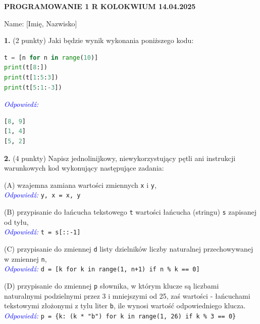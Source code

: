 \documentclass[a4paper,12pt]{article}
\begin{document}
\begin{center}
    \textbf{\Large PROGRAMOWANIE 1 R \hfill KOLOKWIUM \hfill 14.04.2025}
\end{center}

\vspace{0.5cm}
\noindent Name: [Imię, Nazwisko]

\vspace{0.5cm}

\noindent \textbf{1.} (2 punkty) Jaki będzie wynik wykonania poniższego kodu:
\begin{lstlisting}[language=Python]
t = [n for n in range(10)]
print(t[8:])
print(t[1:5:3])
print(t[5:1:-3])
\end{lstlisting}
\textcolor{blue}{\textit{Odpowiedź:}}
\begin{lstlisting}[language=Python, backgroundcolor=\color{white}]
[8, 9]
[1, 4]
[5, 2]
\end{lstlisting}

\vspace{0.5cm}

\noindent \textbf{2.} (4 punkty) Napisz jednolinijkowy, niewykorzystujący pętli ani instrukcji warunkowych kod wykonujący następujące zadania:

\noindent (A) wzajemna zamiana wartości zmiennych \texttt{x} i \texttt{y}, \\
\textcolor{blue}{\textit{Odpowiedź:}} \texttt{y, x = x, y}

\vspace{0.3cm}
\noindent (B) przypisanie do łańcucha tekstowego \texttt{t} wartości łańcucha (stringu) \texttt{s} zapisanej od tyłu, \\
\textcolor{blue}{\textit{Odpowiedź:}} \texttt{t = s[::-1]}

\vspace{0.3cm}
\noindent (C) przypisanie do zmiennej \texttt{d} listy dzielników liczby naturalnej przechowywanej w zmiennej \texttt{n}, \\
\textcolor{blue}{\textit{Odpowiedź:}} \texttt{d = [k for k in range(1, n+1) if n \% k == 0]}

\vspace{0.3cm}
\noindent (D) przypisanie do zmiennej \texttt{p} słownika, w którym klucze są liczbami naturalnymi podzielnymi przez 3 i mniejszymi od 25, zaś wartości - łańcuchami tekstowymi złożonymi z tylu liter \texttt{b}, ile wynosi wartość odpowiedniego klucza. \\
\textcolor{blue}{\textit{Odpowiedź:}} \texttt{p = \{k: (k * "b") for k in range(1, 26) if k \% 3 == 0\}}
\end{document}
